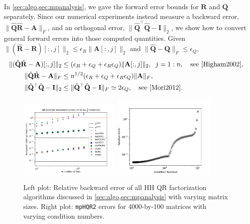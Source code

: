 \documentclass[review,onefignum,onetabnum]{siamart190516}
\newcommand{\bb}[1]{\mathbf{#1}}
\begin{document}
In \cref{sec:algo,sec:mpanalysis}, we gave the forward error bounds for $\bb{R}$ and $\bb{Q}$ separately. 
Since our numerical experiments instead measure a backward error, $\|\hat{\bb{Q}}\hat{\bb{R}}-\bb{A}\|_F$, and an orthogonal error, $\|\hat{\bb{Q}}^{\top}\hat{\bb{Q}}-\bb{I}\|_2$, we show how to convert general forward errors into those computed quantities.
Given $\|(\hat{\bb{R}}-\bb{R})[:,j]\|_2\leq \epsilon_R \|\bb{A}[:,j]\|_2$ and $\|\hat{\bb{Q}}-\bb{Q}\|_F\leq \epsilon_Q$,
\begin{align}
\|(\hat{\bb{Q}}\hat{\bb{R}}-\bb{A})[:,j]\|_2 &\leq (\epsilon_R+\epsilon_Q + \epsilon_R\epsilon_Q)\|\bb{A}[:,j]\|_2,\;\; j=1:n,\quad \text{see \cite{Higham2002}},\\
\|\hat{\bb{Q}}\hat{\bb{R}}-\bb{A}\|_F &\leq n^{1/2}(\epsilon_R+\epsilon_Q + \epsilon_R\epsilon_Q)\|\bb{A}\|_F, \label{eqn:QRA} \\
\|\hat{\bb{Q}}^{\top}\hat{\bb{Q}}-\bb{I}\|_2 &\leq \|\hat{\bb{Q}}^{\top}\hat{\bb{Q}}-\bb{I}\|_F \simeq 2\epsilon_Q,\quad\text{see \cite{Mori2012}} \label{eqn:QQI}.
\end{align}
\begin{figure}[h!]%
	\centering
	\vspace{-10pt}
	\includegraphics[width=0.45\textwidth]{./figures/sizefig.png}
	\includegraphics[width=0.45\textwidth]{./figures/unblocked.pdf}
	\caption{\label{fig:sizemp2}Left plot: Relative backward error of all HH QR factorization algorithms discussed in \cref{sec:algo,sec:mpanalysis} with varying matrix sizes. 
		Right plot: {\tt mpHQR2} errors for $4000$-by-$100$ matrices with varying condition numbers.}
	\vspace{-10pt}
\end{figure} 
\end{document}
